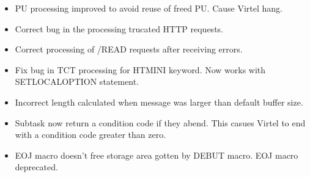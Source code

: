 \documentclass[letterpaper,10pt,english]{sphinxmanual}
\begin{document}
\begin{itemize}
\item {} 
PU processing improved to avoid reuse of freed PU. Cause Virtel hang.

\end{itemize}

\begin{itemize}
\item {} 
Correct bug in the processing trucated HTTP requests.

\end{itemize}

\begin{itemize}
\item {} 
Correct processing of /READ requests after receiving errors.

\end{itemize}

\begin{itemize}
\item {} 
Fix bug in TCT processing for HTMINI keyword. Now works with SET\sphinxhyphen{}LOCAL\sphinxhyphen{}OPTION statement.

\end{itemize}

\begin{itemize}
\item {} 
Incorrect length calculated when message was larger than default buffer size.

\end{itemize}

\begin{itemize}
\item {} 
Subtask now return a condition code if they abend. This casues Virtel to end with a condition code greater than zero.

\end{itemize}

\begin{itemize}
\item {} 
EOJ macro doesn’t free storage area gotten by DEBUT macro. EOJ macro deprecated.

\end{itemize}
\end{document}
